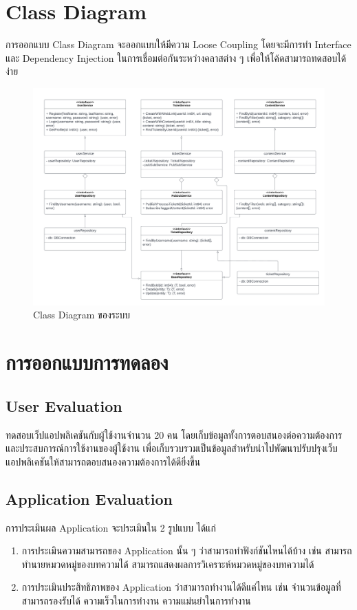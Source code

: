 \documentclass[12pt,oneside,openright,a4paper]{cpe-thai-project}
\begin{document}
\section{Class Diagram}
  \hspace{1cm}การออกแบบ Class Diagram จะออกแบบให้มีความ Loose Coupling โดยจะมีการทำ Interface และ Dependency Injection ในการเชื่อมต่อกันระหว่างคลาสต่าง ๆ
  เพื่อให้โค้ดสามารถทดสอบได้ง่าย
\begin{figure}[!ht]\centering
  \includegraphics[width=15cm]{./img/class_dia.png} 
  \caption{Class Diagram ของระบบ}\label{fig:class_diagram} 
\end{figure} 
\newpage

\section{การออกแบบการทดลอง}
\subsection{User Evaluation}
\hspace*{1cm}ทดสอบเว็ปแอปพลิเคชันกับผู้ใช้งานจำนวน 20 คน โดยเก็บข้อมูลทั้งการตอบสนองต่อความต้องการและประสบการณ์การใช้งานของผู้ใช้งาน 
เพื่อเก็บรวบรวมเป็นข้อมูลสำหรับนำไปพัฒนาปรับปรุงเว็บแอปพลิเคชันให้สามารถตอบสนองความต้องการได้ดียิ่งขึ้น
\subsection{Application Evaluation}
\hspace*{1cm}การประเมินผล Application จะประเมินใน 2 รูปแบบ ได้แก่
  \begin{enumerate}
    \item การประเมินความสามารถของ Application นั้น ๆ ว่าสามารถทำฟังก์ชันไหนได้บ้าง เช่น สามารถทำนายหมวดหมู่ของบทความได้ สามารถแสดงผลการวิเคราะห์หมวดหมู่ของบทความได้
    \item การประเมินประสิทธิภาพของ Application ว่าสามารถทำงานได้ดีแค่ไหน เช่น จำนวนข้อมูลที่สามารถรองรับได้ ความเร็วในการทำงาน ความแม่นยำในการทำงาน
  \end{enumerate}
\end{document}
